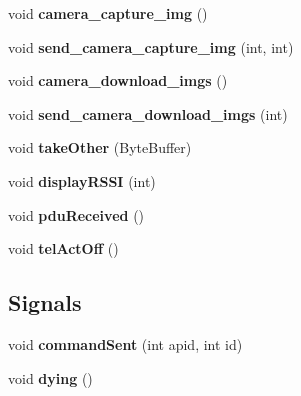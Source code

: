 \begin{DoxyCompactItemize}
\item 
void {\bfseries camera\+\_\+capture\+\_\+img} ()\hypertarget{class_b_c___f_s_w_command_a3b9e432ab284d82a39a508823dfcb29a}{}\label{class_b_c___f_s_w_command_a3b9e432ab284d82a39a508823dfcb29a}

\item 
void {\bfseries send\+\_\+camera\+\_\+capture\+\_\+img} (int, int)\hypertarget{class_b_c___f_s_w_command_a19969904ede1151e8ffcf33d066553e5}{}\label{class_b_c___f_s_w_command_a19969904ede1151e8ffcf33d066553e5}

\item 
void {\bfseries camera\+\_\+download\+\_\+imgs} ()\hypertarget{class_b_c___f_s_w_command_ad9007bc89d10d29f646f7d9976d550e3}{}\label{class_b_c___f_s_w_command_ad9007bc89d10d29f646f7d9976d550e3}

\item 
void {\bfseries send\+\_\+camera\+\_\+download\+\_\+imgs} (int)\hypertarget{class_b_c___f_s_w_command_a58c56b43b794844e29ceeaa90d381518}{}\label{class_b_c___f_s_w_command_a58c56b43b794844e29ceeaa90d381518}

\item 
void {\bfseries take\+Other} (Byte\+Buffer)\hypertarget{class_b_c___f_s_w_command_a144ebee256b1585e75c2a3088f5b9ac7}{}\label{class_b_c___f_s_w_command_a144ebee256b1585e75c2a3088f5b9ac7}

\item 
void {\bfseries display\+R\+S\+SI} (int)\hypertarget{class_b_c___f_s_w_command_aa9392d3146b9868f447a3dbf91d6b51a}{}\label{class_b_c___f_s_w_command_aa9392d3146b9868f447a3dbf91d6b51a}

\item 
void {\bfseries pdu\+Received} ()\hypertarget{class_b_c___f_s_w_command_a0ed16123648f649eb58122dad5e6b86e}{}\label{class_b_c___f_s_w_command_a0ed16123648f649eb58122dad5e6b86e}

\item 
void {\bfseries tel\+Act\+Off} ()\hypertarget{class_b_c___f_s_w_command_a7d9560a21829e36ee7d5f3ab3d46a3fe}{}\label{class_b_c___f_s_w_command_a7d9560a21829e36ee7d5f3ab3d46a3fe}

\end{DoxyCompactItemize}
\subsection*{Signals}
\begin{DoxyCompactItemize}
\item 
void {\bfseries command\+Sent} (int apid, int id)\hypertarget{class_b_c___f_s_w_command_a497a0fc1b67d4f6ec294ac96de8e7392}{}\label{class_b_c___f_s_w_command_a497a0fc1b67d4f6ec294ac96de8e7392}

\item 
void {\bfseries dying} ()\hypertarget{class_b_c___f_s_w_command_a80b774b6b647f1ed333ca836717487a1}{}\label{class_b_c___f_s_w_command_a80b774b6b647f1ed333ca836717487a1}

\end{DoxyCompactItemize}
